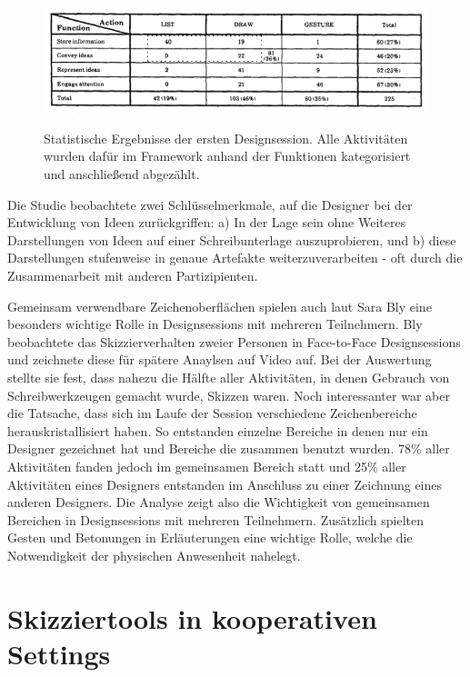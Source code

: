 \begin{figure}
        {\includegraphics[width=1\linewidth]{gfx/tangStatistik}}
		\caption[Statistische Ergebnisse der ersten Designsession \newline \citep{Tang:1988p279}]{Statistische Ergebnisse der ersten Designsession. Alle Aktivitäten wurden dafür im Framework anhand der Funktionen kategorisiert und anschließend abgezählt.}\label{fig:tangStatistik}
\end{figure}
\clearpage

\medskip Die Studie beobachtete zwei Schlüsselmerkmale, auf die Designer bei der Entwicklung von Ideen zurückgriffen: a) In der Lage sein ohne Weiteres Darstellungen von Ideen auf einer Schreibunterlage auszuprobieren, und b) diese Darstellungen stufenweise in genaue Artefakte weiterzuverarbeiten - oft durch die Zusammenarbeit mit anderen Partizipienten. \citep{Tang:1988p279}

\medskip Gemeinsam verwendbare Zeichenoberflächen spielen auch laut Sara Bly \citep{Bly:1988:UDS:62266.62286} eine besonders wichtige Rolle in Designsessions mit mehreren Teilnehmern. 
Bly beobachtete das Skizzierverhalten zweier Personen in Face-to-Face Designsessions und zeichnete diese für spätere Anaylsen auf Video auf. Bei der Auswertung stellte sie fest, dass nahezu die Hälfte aller Aktivitäten, in denen Gebrauch von Schreibwerkzeugen gemacht wurde, Skizzen waren. Noch interessanter war aber die Tatsache, dass sich im Laufe der Session verschiedene Zeichenbereiche herauskristallisiert haben. So entstanden einzelne Bereiche in denen nur ein Designer gezeichnet hat und Bereiche die zusammen benutzt wurden. 78\% aller Aktivitäten fanden jedoch im gemeinsamen Bereich statt und 25\% aller Aktivitäten eines Designers entstanden im Anschluss zu einer Zeichnung eines anderen Designers. Die Analyse zeigt also die Wichtigkeit von gemeinsamen Bereichen in Designsessions mit mehreren Teilnehmern. Zusätzlich spielten Gesten und Betonungen in Erläuterungen eine wichtige Rolle, welche die Notwendigkeit der physischen Anwesenheit nahelegt.

\section{Skizziertools in kooperativen Settings}

